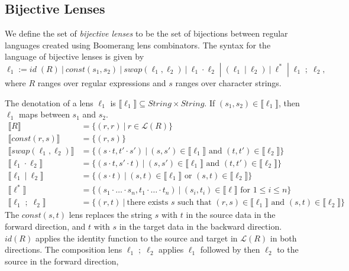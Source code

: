 \documentclass[acmsmall,review,anonymous]{acmart}
\newcommand{\kw}[1]{\ensuremath{\mathit{#1}}}
\newcommand{\sep}{\ensuremath{\ | \ }}
\newcommand{\const}{\ensuremath{\kw{const}}}
\newcommand{\swap}{\ensuremath{\kw{swap}}}
\begin{document}
\subsection{Bijective Lenses}
We define the set of \textit{bijective lenses} to be the set of bijections
between regular languages created using Boomerang lens combinators.
The syntax for the language of bijective lenses is given by
$$\ell_1 := \mathit{id} \; (R) \sep \const(s_1, s_2) \sep  \swap(\ell_1,
\ell_2) \sep \ell_1 \cdot \ell_2 \; |  \; (\ell_1 \sep \ell_2) \sep \ell^* \;
| \; \ell_1 \; ; \;  \ell_2,$$ where $R$ ranges over regular expressions and $s$
ranges over character strings.

The denotation of a lens $\ell_1$ is $\llbracket \ell_1 \rrbracket \subseteq
\mathit{String} \times \mathit{String}$. If $(s_1, s_2) \in \llbracket \ell_1
\rrbracket$, then $\ell_1$ maps between $s_1$ and $s_2$.
\begin{align*}
\llbracket R \rrbracket &= \{(r, r) \sep r \in \mathcal{L}(R)\}\\
\llbracket \const(r, s) \rrbracket &= \{(r, s)\}\\
\llbracket \swap(\ell_1, \ell_2) \rrbracket &= \{(s \cdot t, t' \cdot s') \sep
(s, s') \in \llbracket \ell_1 \rrbracket \text{ and } (t, t') \in \llbracket
\ell_2 \rrbracket\}\\
\llbracket \ell_1 \cdot \ell_2 \rrbracket &= \{(s \cdot t, s' \cdot t) \sep
(s, s') \in \llbracket \ell_1 \rrbracket \text{ and } (t, t') \in \llbracket
\ell_2 \rrbracket\}\\
\llbracket \ell_1 \sep \ell_2 \rrbracket &= \{(s \cdot t) \sep
(s, t) \in \llbracket \ell_1 \rrbracket \text{ or } (s, t) \in \llbracket
\ell_2 \rrbracket\}\\
\llbracket \ell^* \rrbracket &= \{(s_1 \cdot \ldots \cdot s_n, t_1 \cdot \ldots
\cdot t_n) \sep (s_i, t_i) \in \llbracket \ell \rrbracket \text{ for } 1
\leq i \leq n\}\\
\llbracket \ell_1 \; ; \; \ell_2 \rrbracket &= \{(r, t) \sep \text{there exists }s
\text{ such that } (r, s) \in \llbracket \ell_1 \rrbracket \text{ and } (s, t)
\in \llbracket \ell_2 \rrbracket\}
\end{align*}
The $\mathit{\const}(s, t)$ lens replaces the string $s$ with $t$ in the source
data in the forward direction, and $t$ with $s$ in the target data in the backward
direction. $\mathit{id}(R)$ applies the identity function to the source and target
in $\mathcal{L}(R)$ in both directions. The composition lens $\ell_1 \; ; \; \ell_2$
applies $\ell_1$ followed by then $\ell_2$ to the source in the forward direction,
\end{document}

